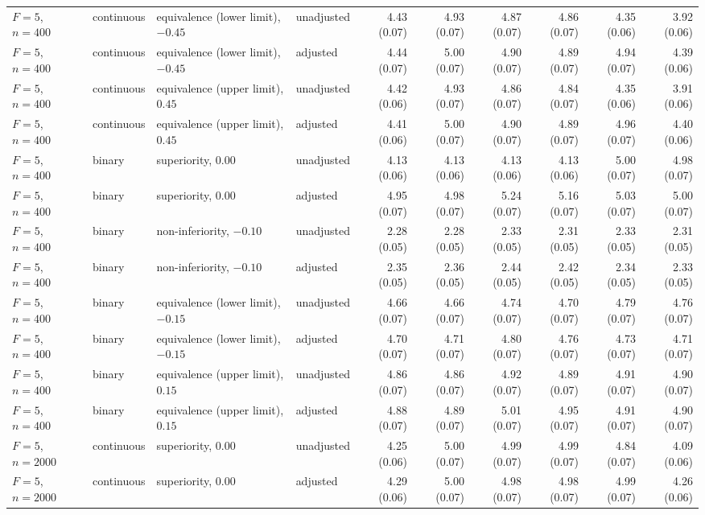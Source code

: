 \documentclass[12pt,a4paper]{article}
\theoremstyle{definition}
\theoremstyle{remark}\newtheorem{remark}{Remark}
\numberwithin{equation}{section}
\begin{document}
\begin{landscape}
\begin{singlespace}
\begin{longtable}{@{}llllrrrrrr@{}}
$F=5$, $n=400$ & continuous & equivalence (lower limit), $-0.45$ & unadjusted & 4.43 (0.07) & 4.93 (0.07) & 4.87 (0.07) & 4.86 (0.07) & 4.35 (0.06) & 3.92 (0.06)\\
$F=5$, $n=400$ & continuous & equivalence (lower limit), $-0.45$ & adjusted & 4.44 (0.07) & 5.00 (0.07) & 4.90 (0.07) & 4.89 (0.07) & 4.94 (0.07) & 4.39 (0.06)\\
$F=5$, $n=400$ & continuous & equivalence (upper limit), $0.45$ & unadjusted & 4.42 (0.06) & 4.93 (0.07) & 4.86 (0.07) & 4.84 (0.07) & 4.35 (0.06) & 3.91 (0.06)\\
$F=5$, $n=400$ & continuous & equivalence (upper limit), $0.45$ & adjusted & 4.41 (0.06) & 5.00 (0.07) & 4.90 (0.07) & 4.89 (0.07) & 4.96 (0.07) & 4.40 (0.06)\\
$F=5$, $n=400$ & binary & superiority, $0.00$ & unadjusted & 4.13 (0.06) & 4.13 (0.06) & 4.13 (0.06) & 4.13 (0.06) & 5.00 (0.07) & 4.98 (0.07)\\
$F=5$, $n=400$ & binary & superiority, $0.00$ & adjusted & 4.95 (0.07) & 4.98 (0.07) & 5.24 (0.07) & 5.16 (0.07) & 5.03 (0.07) & 5.00 (0.07)\\
$F=5$, $n=400$ & binary & non-inferiority, $-0.10$ & unadjusted & 2.28 (0.05) & 2.28 (0.05) & 2.33 (0.05) & 2.31 (0.05) & 2.33 (0.05) & 2.31 (0.05)\\
$F=5$, $n=400$ & binary & non-inferiority, $-0.10$ & adjusted & 2.35 (0.05) & 2.36 (0.05) & 2.44 (0.05) & 2.42 (0.05) & 2.34 (0.05) & 2.33 (0.05)\\
$F=5$, $n=400$ & binary & equivalence (lower limit), $-0.15$ & unadjusted & 4.66 (0.07) & 4.66 (0.07) & 4.74 (0.07) & 4.70 (0.07) & 4.79 (0.07) & 4.76 (0.07)\\
$F=5$, $n=400$ & binary & equivalence (lower limit), $-0.15$ & adjusted & 4.70 (0.07) & 4.71 (0.07) & 4.80 (0.07) & 4.76 (0.07) & 4.73 (0.07) & 4.71 (0.07)\\
$F=5$, $n=400$ & binary & equivalence (upper limit), $0.15$ & unadjusted & 4.86 (0.07) & 4.86 (0.07) & 4.92 (0.07) & 4.89 (0.07) & 4.91 (0.07) & 4.90 (0.07)\\
$F=5$, $n=400$ & binary & equivalence (upper limit), $0.15$ & adjusted & 4.88 (0.07) & 4.89 (0.07) & 5.01 (0.07) & 4.95 (0.07) & 4.91 (0.07) & 4.90 (0.07)\\
$F=5$, $n=2000$ & continuous & superiority, $0.00$ & unadjusted & 4.25 (0.06) & 5.00 (0.07) & 4.99 (0.07) & 4.99 (0.07) & 4.84 (0.07) & 4.09 (0.06)\\
$F=5$, $n=2000$ & continuous & superiority, $0.00$ & adjusted & 4.29 (0.06) & 5.00 (0.07) & 4.98 (0.07) & 4.98 (0.07) & 4.99 (0.07) & 4.26 (0.06)\\

\end{longtable}
\end{singlespace}
\end{landscape}
\end{document}
